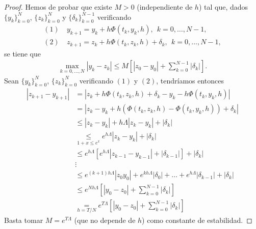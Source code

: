 \begin{proof}
    Hemos de probar que existe $M > 0$ (independiente de $h$) tal que, dados $\{y_k\}_{k=0}^{N}$, $\{z_k\}_{k=0}^{N}$ y $\{\delta_k\}_{k=0}^{N-1}$ verificando
    \begin{align*}
        (1) & \ y_{k+1} = y_k + h\Phi(t_k,y_k,h), \ \ k = 0,\ldots,N-1,            \\
        (2) & \ z_{k+1} = z_k + h\Phi(t_k,z_k,h) + \delta_k, \ \ k = 0,\ldots,N-1,
    \end{align*}
    se tiene que
    \begin{align*}
        \max_{k=0,\ldots,N} |y_k - z_k| \leq M\left[ |z_0 - y_0| + \sum_{k=0}^{N-1} |\delta_k| \right].
    \end{align*}
    Sean $\{y_k\}_{k=0}^{N}$, $\{z_k\}_{k=0}^{N}$ verificando $(1)$ y $(2)$, tendríamos entonces
    \begin{align*}
        |z_{k+1} - y_{k+1}| & = |z_k + h\Phi(t_k,z_k,h) + \delta_k - y_k - h \Phi(t_k,y_k,h)|                                              \\
                            & = |z_k -  y_k + h(\Phi(t_k,z_k,h) - \Phi(t_k,y_k,h)) +\delta_k|                                              \\
                            & \leq |z_k - y_k| + h\Lambda|z_k - y_k| + |\delta_k|                                                          \\
                            & \underset{1 + x \leq e^x}{\leq} e^{h \Lambda} |z_k - y_k| + |\delta_k|                                       \\
                            & \leq e^{h\Lambda} [e^{h\Lambda}|z_{k-1} - y_{k-1}| + |\delta_{k-1}|] + |\delta_k|                            \\
                            & \vdots                                                                                                       \\
                            & \leq e^{(k+1)h\Lambda}|z_0 y_0| + e^{kh\Lambda}|\delta_0| + \ldots + e^{h\Lambda}|\delta_{k-1}| + |\delta_k| \\
                            & \leq e^{Nh\Lambda}\left[ |y_0 - z_0| + \sum_{k=0}^{N-1} |\delta_k| \right]                                   \\
                            & \underset{h = T/N}{=} e^{T\Lambda}\left[ |y_0 - z_0| + \sum_{k=0}^{N-1} |\delta_k| \right]
    \end{align*}
    Basta tomar $M = e^{T\Lambda}$ (que no depende de $h$) como constante de estabilidad.
\end{proof}

